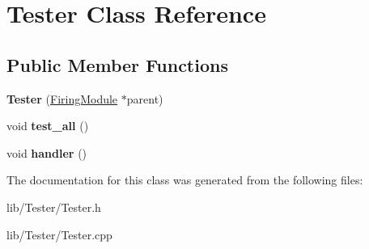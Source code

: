 \hypertarget{class_tester}{}\section{Tester Class Reference}
\label{class_tester}
\subsection*{Public Member Functions}
\begin{DoxyCompactItemize}
\item 
\mbox{\label{class_tester_a7c264a026ec2c76f7a5ae405a524c49f}} 
{\bfseries Tester} (\hyperlink{class_firing_module}{Firing\+Module} $\ast$parent)
\item 
\mbox{\label{class_tester_a27bdcf64f6730b9ad5fd2f54181f9926}} 
void {\bfseries test\+\_\+all} ()
\item 
\mbox{\label{class_tester_ae2cf264af6061402c9aa52394e3f4f92}} 
void {\bfseries handler} ()
\end{DoxyCompactItemize}


The documentation for this class was generated from the following files\+:\begin{DoxyCompactItemize}
\item 
lib/\+Tester/Tester.\+h\item 
lib/\+Tester/Tester.\+cpp\end{DoxyCompactItemize}
